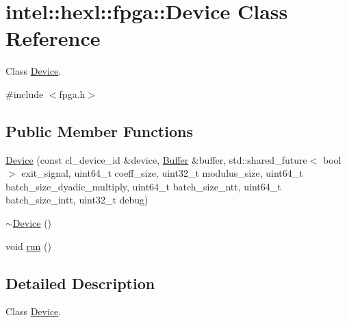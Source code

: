 \hypertarget{classintel_1_1hexl_1_1fpga_1_1Device}{\section{intel\-:\-:hexl\-:\-:fpga\-:\-:Device Class Reference}
\label{classintel_1_1hexl_1_1fpga_1_1Device}
}


Class \hyperlink{classintel_1_1hexl_1_1fpga_1_1Device}{Device}.  




{\ttfamily \#include $<$fpga.\-h$>$}

\subsection*{Public Member Functions}
\begin{DoxyCompactItemize}
\item 
\hyperlink{classintel_1_1hexl_1_1fpga_1_1Device_a444b8a5c92f908f0e61cb5c3513e36a9}{Device} (const cl\-\_\-device\-\_\-id \&device, \hyperlink{classintel_1_1hexl_1_1fpga_1_1Buffer}{Buffer} \&buffer, std\-::shared\-\_\-future$<$ bool $>$ exit\-\_\-signal, uint64\-\_\-t coeff\-\_\-size, uint32\-\_\-t modulus\-\_\-size, uint64\-\_\-t batch\-\_\-size\-\_\-dyadic\-\_\-multiply, uint64\-\_\-t batch\-\_\-size\-\_\-ntt, uint64\-\_\-t batch\-\_\-size\-\_\-intt, uint32\-\_\-t debug)
\item 
\hyperlink{classintel_1_1hexl_1_1fpga_1_1Device_ad7adf350f85c3d0b66607424d3281d5f}{$\sim$\-Device} ()
\item 
void \hyperlink{classintel_1_1hexl_1_1fpga_1_1Device_a91c2dde32f856517ba1f90e6191d2850}{run} ()
\end{DoxyCompactItemize}


\subsection{Detailed Description}
Class \hyperlink{classintel_1_1hexl_1_1fpga_1_1Device}{Device}. 

